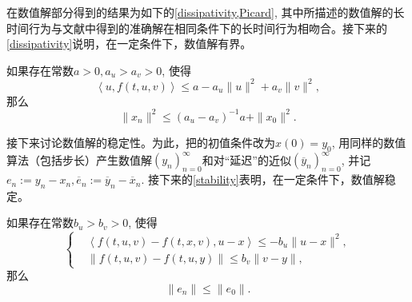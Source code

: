 在数值解部分得到的结果为如下的\cref{dissipativity,Picard}, 其中所描述的数值解的长时间行为与文献中得到的准确解在相同条件下的长时间行为相吻合。接下来的\cref{dissipativity}说明，在一定条件下，数值解有界。
\begin{theorem}\label{dissipativity}
    如果存在常数$a>0,a_u>a_v>0$, 使得
    \begin{equation*}
        \left<u,f(t,u,v)\right>\leqslant a-a_u \|u\|^2+a_v \|v\|^2,
    \end{equation*}
    那么
    \begin{equation}\label{耗散性结果}
        \|x_n\|^2\leqslant \left(a_u-a_v\right)^{-1}a+\|x_0\|^2.
    \end{equation}
\end{theorem}
接下来讨论数值解的稳定性。为此，把\mainEquation 的初值条件改为$x(0)=y_0$, 用同样的数值算法（包括步长）产生数值解$\left(y_n\right)_{n=0}^\infty$和对“延迟”的近似$\left(\overline y_n\right)_{n=0}^\infty$, 并记$e_n:=y_n-x_n, \overline e_n:=\overline y_n-\overline x_n$. 接下来的\cref{stability}表明，在一定条件下，数值解稳定。
\begin{theorem}\label{stability}
    如果存在常数$b_u>b_v>0$, 使得
    \begin{equation*}
        \left\{
            \begin{aligned}
                &\left<f(t,u,v)-f(t,x,v),u-x\right>\leqslant -b_u \|u-x\|^2,
                \\ &\|f(t,u,v)-f(t,u,y)\|\leqslant b_v \|v-y\|,
            \end{aligned}
        \right.
    \end{equation*}
    那么
    \begin{equation*}
        \|e_n\|\leqslant \|e_0\|.
    \end{equation*}
\end{theorem}